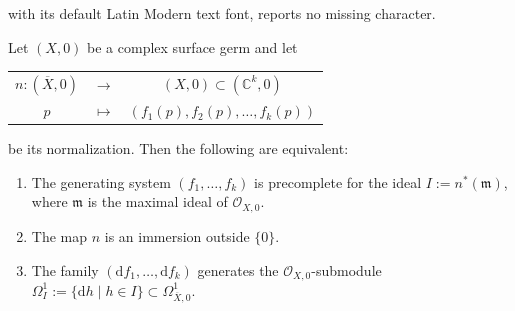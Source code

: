\documentclass[10pt,a4paper]{amsart}
\begin{document}
with its default Latin Modern text font, reports no missing character.
\begin{lemm}\label{keylemma}
Let $(X,0)$ be a complex surface germ and let 
\begin{center}
\begin{tabular}{ccc}
$n:(\overline{X},0)$ & $\longrightarrow$ & $(X,0) \subset (\mathbb{C}^k,0)$ \\
$p$ & $\longmapsto$ & $(f_1(p),f_2(p),\dots,f_k(p))$
\end{tabular}
\end{center}
be its normalization. Then the following are equivalent:
\begin{enumerate}
  \item The generating system $(f_1,\dots,f_k)$ is precomplete for the ideal $I:=n^*(\mathfrak{m})$, where $\mathfrak{m}$ is the maximal ideal of $\mathcal{O}_{X,0}$. \label{ma}
    \item The map $n$
    is an immersion outside $\{0\}$.\label{ho}
    
  
    
    \item The family $(\mathrm{d}f_1,\dots,\mathrm{d}f_k)$ generates the $\mathcal{O}_{X,0}$-submodule $\Omega_I^1 := \{ \mathrm{d}h \mid h \in I \}
    \subset \Omega^1_{\overline{X},0}.$\label{gani}
\end{enumerate}
\end{lemm}
\end{document}
